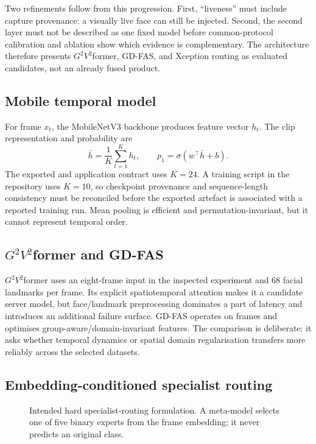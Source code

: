 Two refinements follow from this progression. First, ``liveness'' must include
capture provenance: a visually live face can still be injected. Second, the
second layer must not be described as one fixed model before common-protocol
calibration and ablation show which evidence is complementary. The architecture
therefore presents $G^2V^2$former, GD-FAS, and Xception routing as evaluated
candidates, not an already fused product.

\subsection{Mobile temporal model}

For frame $x_t$, the MobileNetV3 backbone produces feature vector $h_t$. The clip
representation and probability are
\begin{equation}
  \bar h=\frac{1}{K}\sum_{t=1}^{K}h_t,
  \qquad p_1=\sigma(w^\top \bar h+b).
\end{equation}
The exported and application contract uses $K=24$. A training script in the
repository uses $K=10$, so checkpoint provenance and sequence-length consistency
must be reconciled before the exported artefact is associated with a reported
training run. Mean pooling is efficient and permutation-invariant, but it cannot
represent temporal order.

\subsection{\texorpdfstring{$G^2V^2$former}{G2V2Former} and GD-FAS}

$G^2V^2$former uses an eight-frame input in the inspected experiment and 68
facial landmarks per frame. Its explicit spatiotemporal attention makes it a
candidate server model, but face/landmark preprocessing dominates a part of
latency and introduces an additional failure surface. GD-FAS operates on frames
and optimises group-aware/domain-invariant features. The comparison is deliberate:
it asks whether temporal dynamics or spatial domain regularisation transfers more
reliably across the selected datasets.

\subsection{Embedding-conditioned specialist routing}

\begin{figure}[H]
  \centering
  \resizebox{0.98\textwidth}{!}{}
  \caption{Intended hard specialist-routing formulation. A meta-model selects one
  of five binary experts from the frame embedding; it never predicts an original
  class.}
  \label{fig:intended-router}
\end{figure}

